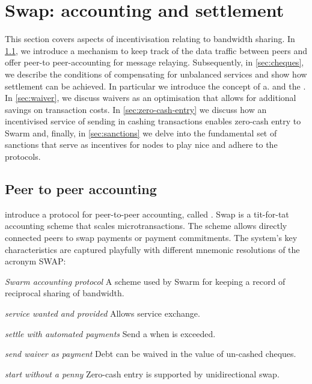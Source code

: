 \section{Swap: accounting and settlement\statusgreen}\label{sec:accounting-and-settlement}

\green{}

This section covers aspects of incentivisation relating to bandwidth sharing. 
In \ref{sec:accounting}, we introduce a mechanism to keep track of the data traffic between peers and offer peer-to peer-accounting for message relaying.
Subsequently, in \ref{sec:cheques}, we describe the conditions of compensating for unbalanced services and show how settlement can be achieved.
In particular we introduce the concept of a.  and the . In \ref{sec:waiver}, we discuss waivers as an optimisation that allows for additional savings on transaction costs. In \ref{sec:zero-cash-entry} we discuss how an incentivised service of sending in cashing transactions enables zero-cash entry to Swarm and, finally, in \ref{sec:sanctions} we delve into the fundamental set of sanctions that serve as incentives for nodes to play nice and adhere to the protocols.

\subsection{Peer to peer accounting\statusgreen}\label{sec:accounting}


\citet{ethersphere2016sw3} introduce a protocol for peer-to-peer accounting, called . Swap is a tit-for-tat accounting scheme that scales microtransactions. The scheme allows directly connected peers to swap payments or payment commitments. The system's key characteristics are captured playfully with different mnemonic resolutions of the acronym SWAP:

\begin{labelledlist}
    \item[\emph{Swarm accounting protocol}] A scheme used by Swarm for keeping a record of reciprocal sharing of bandwidth.
    \item[\emph{service wanted and provided}] Allows service exchange.
    \item[\emph{settle with automated payments}] Send a  when  is exceeded.
    \item[\emph{send waiver as payment}] Debt can be waived in the value of un-cashed cheques. 
    \item[\emph{start without a penny}] Zero-cash entry is supported by unidirectional swap.
\end{labelledlist}


